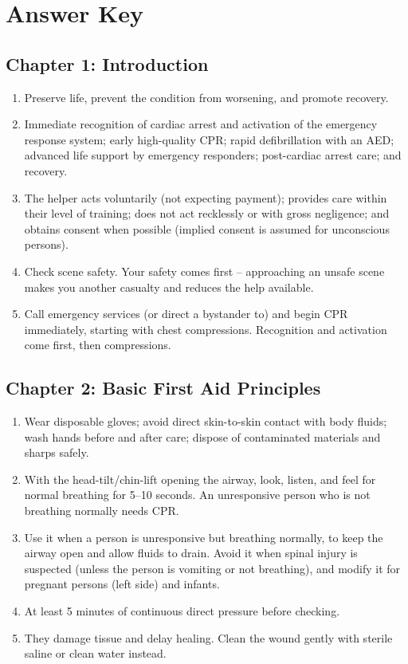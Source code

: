 \chapter*{Answer Key}

\section*{Chapter 1: Introduction}

\begin{enumerate}[leftmargin=*]
\item Preserve life, prevent the condition from worsening, and promote recovery.
\item Immediate recognition of cardiac arrest and activation of the emergency response system; early high-quality CPR; rapid defibrillation with an AED; advanced life support by emergency responders; post-cardiac arrest care; and recovery.
\item The helper acts voluntarily (not expecting payment); provides care within their level of training; does not act recklessly or with gross negligence; and obtains consent when possible (implied consent is assumed for unconscious persons).
\item Check scene safety. Your safety comes first -- approaching an unsafe scene makes you another casualty and reduces the help available.
\item Call emergency services (or direct a bystander to) and begin CPR immediately, starting with chest compressions. Recognition and activation come first, then compressions.
\end{enumerate}

\section*{Chapter 2: Basic First Aid Principles}

\begin{enumerate}[leftmargin=*]
\item Wear disposable gloves; avoid direct skin-to-skin contact with body fluids; wash hands before and after care; dispose of contaminated materials and sharps safely.
\item With the head-tilt/chin-lift opening the airway, look, listen, and feel for normal breathing for 5--10 seconds. An unresponsive person who is not breathing normally needs CPR.
\item Use it when a person is unresponsive but breathing normally, to keep the airway open and allow fluids to drain. Avoid it when spinal injury is suspected (unless the person is vomiting or not breathing), and modify it for pregnant persons (left side) and infants.
\item At least 5 minutes of continuous direct pressure before checking.
\item They damage tissue and delay healing. Clean the wound gently with sterile saline or clean water instead.
\end{enumerate}

